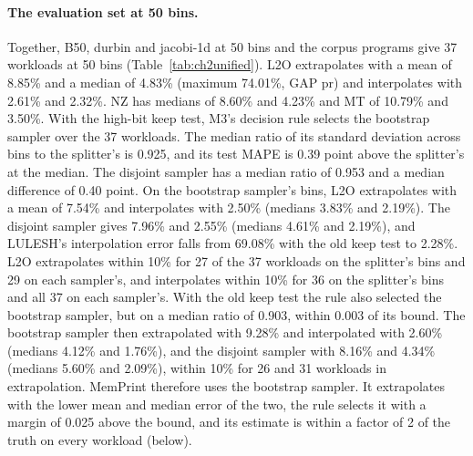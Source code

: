 \documentclass[11pt]{article}
\newcommand{\memprint}{MemPrint}
\begin{document}
\paragraph{The evaluation set at 50 bins.} Together, B50, durbin and jacobi-1d at 50 bins and the corpus programs
give 37 workloads at 50 bins (Table~\ref{tab:ch2unified}). L2O extrapolates with a mean of 8.85\% and a median of
4.83\% (maximum 74.01\%, GAP pr) and interpolates with 2.61\% and 2.32\%. NZ has medians of 8.60\% and 4.23\% and MT
of 10.79\% and 3.50\%. With the high-bit keep test, M3's decision rule selects the bootstrap sampler over the 37
workloads. The median ratio of its standard deviation across bins to the splitter's is 0.925, and its test MAPE is
0.39 point above the splitter's at the median. The disjoint sampler has a median ratio of 0.953 and a median
difference of 0.40 point. On the bootstrap sampler's bins, L2O extrapolates with a mean of 7.54\% and interpolates
with 2.50\% (medians 3.83\% and 2.19\%). The disjoint sampler gives 7.96\% and 2.55\% (medians 4.61\% and
2.19\%), and LULESH's interpolation error falls from 69.08\% with the old keep test to 2.28\%. L2O extrapolates
within 10\% for 27 of the 37 workloads on the splitter's bins and 29 on each sampler's, and interpolates within
10\% for 36 on the splitter's bins and all 37 on each sampler's. With the old keep test the rule also selected the
bootstrap sampler, but on a median ratio of 0.903, within 0.003 of its bound. The bootstrap sampler then
extrapolated with 9.28\% and interpolated with 2.60\% (medians 4.12\% and 1.76\%), and the disjoint sampler with
8.16\% and 4.34\% (medians 5.60\% and 2.09\%), within 10\% for 26 and 31 workloads in extrapolation.
\memprint{} therefore uses the bootstrap sampler. It extrapolates with the lower mean and median error of the two,
the rule selects it with a margin of 0.025 above the bound, and its estimate is within a factor of 2 of the truth on
every workload (below).
\end{document}
